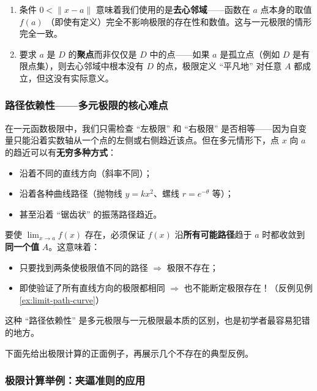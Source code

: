\documentclass[lang=cn,11pt]{elegantbook}
\begin{document}
\begin{note}[定义的关键细节]
\begin{enumerate}
  \item[(1)] 条件 $0<\|x-a\|$ 意味着我们使用的是\textbf{去心邻域}——函数在 $a$ 点本身的取值 $f(a)$ （即使有定义）完全不影响极限的存在性和数值。这与一元极限的情形完全一致。
  \item[(2)] 要求 $a$ 是 $D$ 的\textbf{聚点}而非仅仅是 $D$ 中的点——如果 $a$ 是孤立点（例如 $D$ 是有限点集），则去心邻域中根本没有 $D$ 的点，极限定义 ``平凡地'' 对任意 $A$ 都成立，但这没有实际意义。
\end{enumerate}
\end{note}


\subsubsection{路径依赖性——多元极限的核心难点}

在一元函数极限中，我们只需检查 ``左极限'' 和 ``右极限'' 是否相等——因为自变量只能沿着实数轴从一个点的左侧或右侧趋近该点。但在多元情形下，点 $x$ 向 $a$ 的趋近可以有\textbf{无穷多种方式}：
\begin{itemize}
  \item 沿着不同的直线方向（斜率不同）；
  \item 沿着各种曲线路径（抛物线 $y=kx^2$、螺线 $r=e^{-\theta}$ 等）；
  \item 甚至沿着 ``锯齿状'' 的振荡路径趋近。
\end{itemize}

\begin{note}[极限存在的必要条件]
要使 $\lim_{x\to a}f(x)$ 存在，必须保证 $f(x)$ 沿\textbf{所有可能路径}趋于 $a$ 时都收敛到\textbf{同一个值} $A$。这意味着：
\begin{itemize}
  \item 只要找到两条使极限值不同的路径 $\Rightarrow$ 极限不存在；
  \item 即使验证了所有直线方向的极限都相同 $\Rightarrow$ 也不能断定极限存在！（反例见例 \ref{ex:limit-path-curve}）
\end{itemize}
这种 ``路径依赖性'' 是多元极限与一元极限最本质的区别，也是初学者最容易犯错的地方。
\end{note}

下面先给出极限计算的正面例子，再展示几个不存在的典型反例。


\subsubsection{极限计算举例：夹逼准则的应用}
\end{document}
